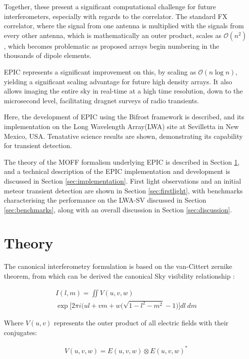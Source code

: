 \documentclass[bibliography=totocnumbered, twocolumn]{article}
\begin{document}
Together, these present a significant computational challenge for
future interferometers, especially with regards to the correlator.
The standard FX correlator, where the signal from one antenna is
multiplied with the signals from every other antenna, which is
mathematically an outer product, scales as $\mathcal{O}(n^2)$,
which becomes problematic as proposed arrays begin numbering in
the thousands of dipole elements.

EPIC represents a significant improvement on this, by scaling as
$\mathcal{O}(n\log{n})$, yielding a significant scaling advantage
for future high density arrays. It also allows imaging the entire
sky in real-time at a high time resolution, down to the microsecond
level, facilitating dragnet surveys of radio transients.

Here, the development of EPIC using the Bifrost framework is
described, and its implementation on the Long Wavelength Array(LWA)
site at Sevilletta in New Mexico, USA. Tenatative science results
are shown, demonstrating its capability for transient detection.

The theory of the MOFF formalism underlying EPIC is described in 
Section \ref{sec:theory}, and a technical description of the
EPIC implementation and development is discussed in Section
\ref{sec:implementation}. First light observations and an initial
meteor transient detection are shown in Section \ref{sec:firstlight},
with benchmarks characterising the performance on the LWA-SV discussed
in Section \ref{sec:benchmarks}, along with an overall discussion in
Section \ref{sec:discussion}.

\section{Theory} \label{sec:theory}

The canonical interferometry formulation is based on the van-Cittert
zernike theorem, from which can be derived the canonical Sky
visibility relationship
\cite{born_principles_1999}\cite{ryle_synthesis_1960}:

\begin{multline} \label{eq:vc}
 I(l,m) = \iint V(u,v,w) \\ \exp\bigg[2\pi i \big(ul + vm + w\big(\sqrt{1-l^2-m^2}-1\big)\bigg]dl\: dm
\end{multline}

Where $V(u,v)$ represents the outer product of all electric fields
with their conjugates:

\begin{align} \label{eq:vis}
  V(u,v,w) = E(u,v,w) \otimes E(u,v,w)^{\ast}
\end{align}
\end{document}
